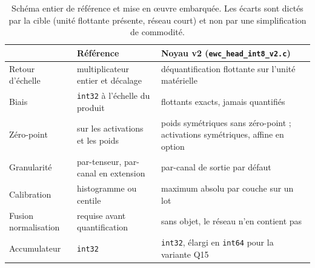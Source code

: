 \begin{table}[htbp]
\centering
\caption{Schéma entier de référence et mise en {\oe}uvre embarquée. Les écarts sont dictés par la cible
(unité flottante présente, réseau court) et non par une simplification de commodité.}
\label{tab:quant_ref}
\footnotesize
\begin{tabular}{@{}p{30mm}p{40mm}p{45mm}@{}}
\toprule
 & \textbf{Référence \cite{Jacob2018}} & \textbf{Noyau v2 (\texttt{ewc\_head\_int8\_v2.c})} \\
\midrule
Retour d'échelle    & multiplicateur entier et décalage & déquantification flottante sur l'unité matérielle \\
Biais               & \texttt{int32} à l'échelle du produit & flottants exacts, jamais quantifiés \\
Zéro-point          & sur les activations et les poids & poids symétriques sans zéro-point ; activations symétriques, affine en option \\
Granularité         & par-tenseur, par-canal en extension & par-canal de sortie par défaut \\
Calibration         & histogramme ou centile & maximum absolu par couche sur un lot \\
Fusion normalisation & requise avant quantification & sans objet, le réseau n'en contient pas \\
Accumulateur        & \texttt{int32} & \texttt{int32}, élargi en \texttt{int64} pour la variante Q15 \\
\bottomrule
\end{tabular}
\end{table}


